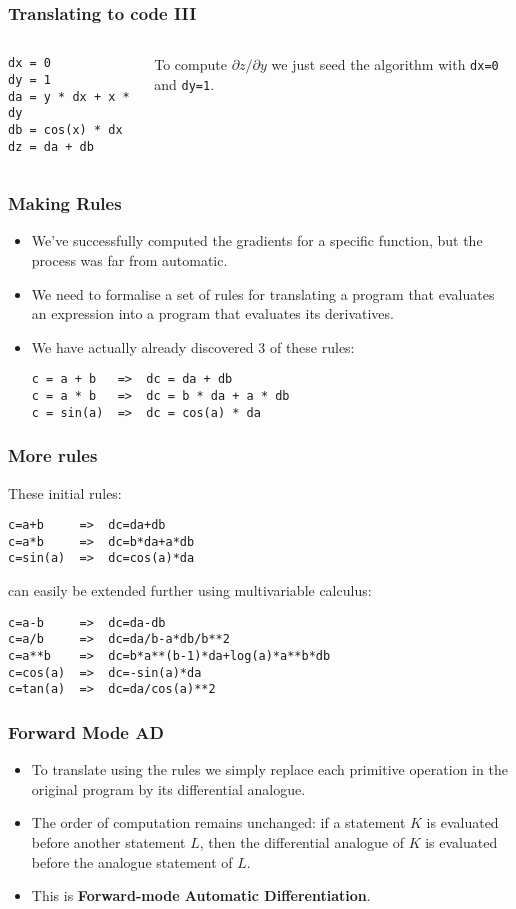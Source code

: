 \documentclass{beamer}
\begin{document}
\begin{frame}[fragile]
\frametitle{Translating to code III}

\begin{columns}
\begin{lstlisting}
dx = 0
dy = 1
da = y * dx + x * dy
db = cos(x) * dx
dz = da + db	
\end{lstlisting}


To compute $\partial z/\partial y$ we just seed the algorithm with \lstinline!dx=0! and \lstinline!dy=1!.
\end{columns}
\end{frame}

\begin{frame}[fragile]
\frametitle{Making Rules}

\begin{itemize}
	\item<+-> We've successfully computed the gradients for a specific function, but the process was far from automatic. 
	\item<+-> We need to formalise a set of rules for translating a program that evaluates an expression into a program that evaluates its derivatives.
	\item<+-> We have actually already discovered 3 of these rules:
\begin{lstlisting}
c = a + b   =>  dc = da + db
c = a * b   =>  dc = b * da + a * db
c = sin(a)  =>  dc = cos(a) * da
\end{lstlisting}
\end{itemize}

\end{frame}

\begin{frame}[fragile]
\frametitle{More rules}

These initial rules:
\begin{lstlisting}
c=a+b     =>  dc=da+db
c=a*b     =>  dc=b*da+a*db
c=sin(a)  =>  dc=cos(a)*da
\end{lstlisting}
can easily be extended further using multivariable calculus:
\begin{lstlisting}
c=a-b     =>  dc=da-db
c=a/b     =>  dc=da/b-a*db/b**2
c=a**b    =>  dc=b*a**(b-1)*da+log(a)*a**b*db
c=cos(a)  =>  dc=-sin(a)*da
c=tan(a)  =>  dc=da/cos(a)**2
\end{lstlisting}
\end{frame}

\begin{frame}
\frametitle{Forward Mode AD}
\begin{itemize}
	\item<+-> To translate using the rules we simply replace each primitive operation in the original program by its differential analogue.
	\item<+-> The order of computation remains unchanged: if a statement $K$ is evaluated before another statement $L$, then the differential analogue of $K$ is evaluated before the analogue statement of $L$.
	\item<+-> This is \textbf{Forward-mode Automatic Differentiation}.
\end{itemize}
\end{frame}
\end{document}
